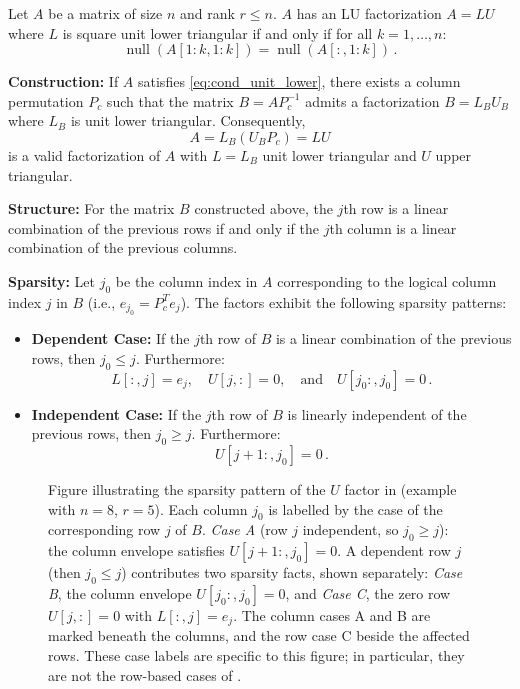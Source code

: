 \documentclass[10pt,twoside]{siamart1116}
\DeclareMathOperator{\nl}{null}
\numberwithin{theorem}{section}
\begin{document}
\begin{theorem}\label{thm:main_unit_lower}
  Let $A$ be a matrix of size $n$ and rank $r \le n$. $A$ has an LU factorization $A = LU$ where $L$ is square unit lower triangular if and only if for all $k = 1, \ldots, n$:
  \begin{equation}
    \label{eq:cond_unit_lower}
    \nl(A[1:k,1:k]) = \nl(A[:,1:k]) \,.
  \end{equation}

  \noindent\textbf{Construction:} If $A$ satisfies \cref{eq:cond_unit_lower}, there exists a column permutation $P_c$ such that the matrix $B = A P_c^{-1}$ admits a factorization $B = L_B U_B$ where $L_B$ is unit lower triangular. Consequently,
  \[ A = L_B (U_B P_c) = L U \]
  is a valid factorization of $A$ with $L=L_B$ unit lower triangular and $U$ upper triangular.

  \noindent\textbf{Structure:} For the matrix $B$ constructed above, the $j$th row is a linear combination of the previous rows if and only if the $j$th column is a linear combination of the previous columns.

  \noindent\textbf{Sparsity:} Let $j_0$ be the column index in $A$ corresponding to the logical column index $j$ in $B$ (i.e., $e_{j_0} = P_c^T e_j$). The factors exhibit the following sparsity patterns:
  \begin{itemize}
    \item \textbf{Dependent Case:} If the $j$th row of $B$ is a linear combination of the previous rows, then $j_0 \le j$. Furthermore:
      \[ L[:,j] = e_j, \quad U[j,:] = 0, \quad \text{and} \quad U[j_0:, j_0] = 0 \,. \]
    \item \textbf{Independent Case:} If the $j$th row of $B$ is linearly independent of the previous rows, then $j_0 \ge j$. Furthermore:
      \[ U[j+1:, j_0] = 0 \,. \]
  \end{itemize}
\end{theorem}

\begin{figure}[htbp]
  \centering
  
  \caption{Figure illustrating the sparsity pattern of the $U$ factor in  (example with $n=8$, $r=5$). Each column $j_0$ is labelled by the case of the corresponding row $j$ of $B$. \emph{Case A} (row $j$ independent, so $j_0 \ge j$): the column envelope satisfies $U[j+1:,j_0]=0$. A dependent row $j$ (then $j_0 \le j$) contributes two sparsity facts, shown separately: \emph{Case B}, the column envelope $U[j_0:,j_0]=0$, and \emph{Case C}, the zero row $U[j,:]=0$ with $L[:,j]=e_j$. The column cases A and B are marked beneath the columns, and the row case C beside the affected rows. These case labels are specific to this figure; in particular, they are not the row-based cases of .}
  \label{fig:unit_lower_sparsity}
\end{figure}
\end{document}
